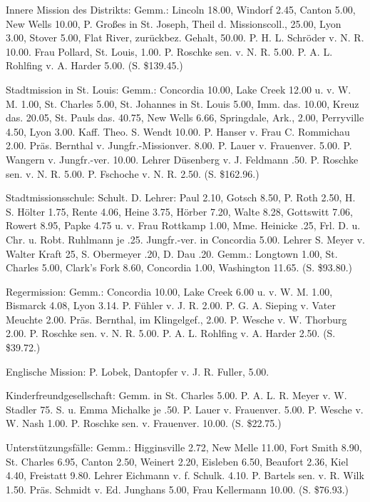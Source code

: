 Innere Mission des Distrikts: Gemm.: Lincoln 18.00, Windorf 2.45, Canton 5.00, New Wells 10.00, P. Großes in St. Joseph, Theil d. Missionscoll., 25.00, Lyon 3.00, Stover 5.00, Flat River, zurückbez. Gehalt, 50.00. P. H. L. Schröder v. N. R. 10.00. Frau Pollard, St. Louis, 1.00. P. Roschke sen. v. N. R. 5.00. P. A. L. Rohlfing v. A. Harder 5.00. (S. \$139.45.)

Stadtmission in St. Louis: Gemm.: Concordia 10.00, Lake Creek 12.00 u. v. W. M. 1.00, St. Charles 5.00, St. Johannes in St. Louis 5.00, Imm. das. 10.00, Kreuz das. 20.05, St. Pauls das. 40.75, New Wells 6.66, Springdale, Ark., 2.00, Perryville 4.50, Lyon 3.00. Kaff. Theo. S. Wendt 10.00. P. Hanser v. Frau C. Rommichau 2.00. Präs. Bernthal v. Jungfr.-Missionver. 8.00. P. Lauer v. Frauenver. 5.00. P. Wangern v. Jungfr.-ver. 10.00. Lehrer Düsenberg v. J. Feldmann .50. P. Roschke sen. v. N. R. 5.00. P. Fschoche v. N. R. 2.50. (S. \$162.96.)

Stadtmissionsschule: Schult. D. Lehrer: Paul 2.10, Gotsch 8.50, P. Roth 2.50, H. S. Hölter 1.75, Rente 4.06, Heine 3.75, Hörber 7.20, Walte 8.28, Gottswitt 7.06, Rowert 8.95, Papke 4.75 u. v. Frau Rottkamp 1.00, Mme. Heinicke .25, Frl. D. u. Chr. u. Robt. Ruhlmann je .25. Jungfr.-ver. in Concordia 5.00. Lehrer S. Meyer v. Walter Kraft 25, S. Obermeyer .20, D. Dau .20. Gemm.: Longtown 1.00, St. Charles 5.00, Clark’s Fork 8.60, Concordia 1.00, Washington 11.65. (S. \$93.80.)

Regermission: Gemm.: Concordia 10.00, Lake Creek 6.00 u. v. W. M. 1.00, Bismarck 4.08, Lyon 3.14. P. Fühler v. J. R. 2.00. P. G. A. Sieping v. Vater Meuchte 2.00. Präs. Bernthal, im Klingelgef., 2.00. P. Wesche v. W. Thorburg 2.00. P. Roschke sen. v. N. R. 5.00. P. A. L. Rohlfing v. A. Harder 2.50. (S. \$39.72.)

Englische Mission: P. Lobek, Dantopfer v. J. R. Fuller, 5.00.

Kinderfreundgesellschaft: Gemm. in St. Charles 5.00. P. A. L. R. Meyer v. W. Stadler 75. S. u. Emma Michalke je .50. P. Lauer v. Frauenver. 5.00. P. Wesche v. W. Nash 1.00. P. Roschke sen. v. Frauenver. 10.00. (S. \$22.75.)

Unterstützungsfälle: Gemm.: Higginsville 2.72, New Melle 11.00, Fort Smith 8.90, St. Charles 6.95, Canton 2.50, Weinert 2.20, Eisleben
6.50, Beaufort 2.36, Kiel 4.40, Freistatt 9.80. Lehrer Eichmann v. f. Schulk. 4.10. P. Bartels sen. v. R. Wilk 1.50. Präs. Schmidt v. Ed. Junghans 5.00, Frau Kellermann 10.00. (S. \$76.93.)

